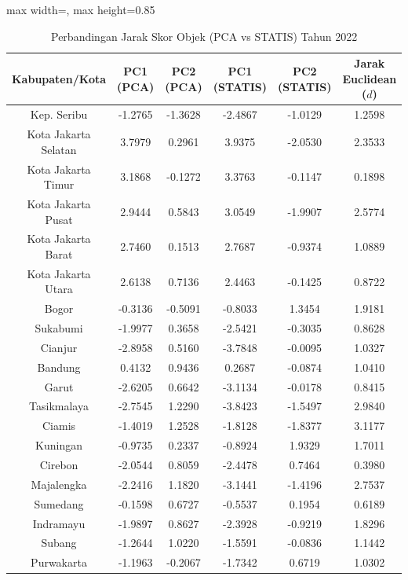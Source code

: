 \begin{table}[H]
\centering
\caption{Perbandingan Jarak Skor Objek (PCA vs STATIS) Tahun 2022} \makeatletter{}\makeatother
\begin{adjustbox}{max width=\textwidth, max height=0.85\textheight}
\begin{tabular}{|c|c|c|c|c|c|}
\hline
\textbf{Kabupaten/Kota} & \textbf{PC1 (PCA)} & \textbf{PC2 (PCA)} & \textbf{PC1 (STATIS)} & \textbf{PC2 (STATIS)} & \textbf{Jarak Euclidean ($d$)} \\
\hline
Kep. Seribu & -1.2765 & -1.3628 & -2.4867 & -1.0129 & 1.2598 \\
Kota Jakarta Selatan & 3.7979 & 0.2961 & 3.9375 & -2.0530 & 2.3533 \\
Kota Jakarta Timur & 3.1868 & -0.1272 & 3.3763 & -0.1147 & 0.1898 \\
Kota Jakarta Pusat & 2.9444 & 0.5843 & 3.0549 & -1.9907 & 2.5774 \\
Kota Jakarta Barat & 2.7460 & 0.1513 & 2.7687 & -0.9374 & 1.0889 \\
Kota Jakarta Utara & 2.6138 & 0.7136 & 2.4463 & -0.1425 & 0.8722 \\
Bogor & -0.3136 & -0.5091 & -0.8033 & 1.3454 & 1.9181 \\
Sukabumi & -1.9977 & 0.3658 & -2.5421 & -0.3035 & 0.8628 \\
Cianjur & -2.8958 & 0.5160 & -3.7848 & -0.0095 & 1.0327 \\
Bandung & 0.4132 & 0.9436 & 0.2687 & -0.0874 & 1.0410 \\
Garut & -2.6205 & 0.6642 & -3.1134 & -0.0178 & 0.8415 \\
Tasikmalaya & -2.7545 & 1.2290 & -3.8423 & -1.5497 & 2.9840 \\
Ciamis & -1.4019 & 1.2528 & -1.8128 & -1.8377 & 3.1177 \\
Kuningan & -0.9735 & 0.2337 & -0.8924 & 1.9329 & 1.7011 \\
Cirebon & -2.0544 & 0.8059 & -2.4478 & 0.7464 & 0.3980 \\
Majalengka & -2.2416 & 1.1820 & -3.1441 & -1.4196 & 2.7537 \\
Sumedang & -0.1598 & 0.6727 & -0.5537 & 0.1954 & 0.6189 \\
Indramayu & -1.9897 & 0.8627 & -2.3928 & -0.9219 & 1.8296 \\
Subang & -1.2644 & 1.0220 & -1.5591 & -0.0836 & 1.1442 \\
Purwakarta & -1.1963 & -0.2067 & -1.7342 & 0.6719 & 1.0302 \\

\end{tabular}
\end{adjustbox}
\end{table}
